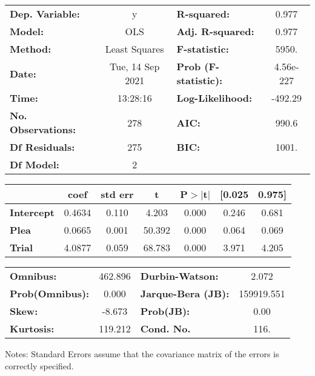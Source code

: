 \begin{center}
\begin{tabular}{lclc}
\toprule
\textbf{Dep. Variable:}    &        y         & \textbf{  R-squared:         } &     0.977   \\
\textbf{Model:}            &       OLS        & \textbf{  Adj. R-squared:    } &     0.977   \\
\textbf{Method:}           &  Least Squares   & \textbf{  F-statistic:       } &     5950.   \\
\textbf{Date:}             & Tue, 14 Sep 2021 & \textbf{  Prob (F-statistic):} & 4.56e-227   \\
\textbf{Time:}             &     13:28:16     & \textbf{  Log-Likelihood:    } &   -492.29   \\
\textbf{No. Observations:} &         278      & \textbf{  AIC:               } &     990.6   \\
\textbf{Df Residuals:}     &         275      & \textbf{  BIC:               } &     1001.   \\
\textbf{Df Model:}         &           2      & \textbf{                     } &             \\
\bottomrule
\end{tabular}
\begin{tabular}{lcccccc}
                   & \textbf{coef} & \textbf{std err} & \textbf{t} & \textbf{P$> |$t$|$} & \textbf{[0.025} & \textbf{0.975]}  \\
\midrule
\textbf{Intercept} &       0.4634  &        0.110     &     4.203  &         0.000        &        0.246    &        0.681     \\
\textbf{Plea}      &       0.0665  &        0.001     &    50.392  &         0.000        &        0.064    &        0.069     \\
\textbf{Trial}     &       4.0877  &        0.059     &    68.783  &         0.000        &        3.971    &        4.205     \\
\bottomrule
\end{tabular}
\begin{tabular}{lclc}
\textbf{Omnibus:}       & 462.896 & \textbf{  Durbin-Watson:     } &     2.072   \\
\textbf{Prob(Omnibus):} &   0.000 & \textbf{  Jarque-Bera (JB):  } & 159919.551  \\
\textbf{Skew:}          &  -8.673 & \textbf{  Prob(JB):          } &      0.00   \\
\textbf{Kurtosis:}      & 119.212 & \textbf{  Cond. No.          } &      116.   \\
\bottomrule
\end{tabular}
\end{center}

Notes: \newline
 [1] Standard Errors assume that the covariance matrix of the errors is correctly specified.